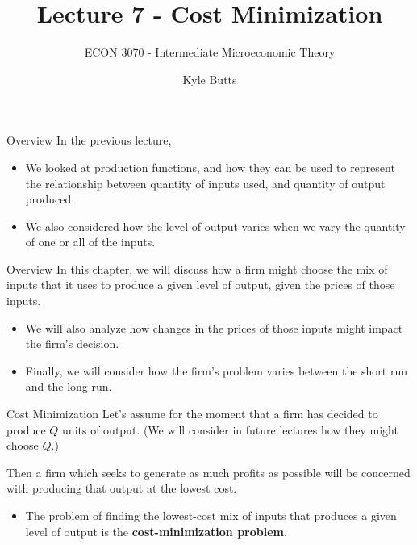 \documentclass[11pt,t]{beamer}
\author{Kyle Butts}
\title{Lecture 7  - Cost Minimization}
\subtitle{ECON 3070 - Intermediate Microeconomic Theory}
\begin{document}
\begin{frame}
  \titlepage
\end{frame}

\begin{frame}{Overview}
  In the previous lecture,

  \begin{itemize}
    \item We looked at production functions, and how they can be used to represent the relationship between quantity of inputs used, and quantity of output produced.

    \item We also considered how the level of output varies when we vary the quantity of one or all of the inputs.
  \end{itemize}
\end{frame}

\begin{frame}{Overview}
  In this chapter, we will discuss how a firm might choose the mix of inputs that it uses to produce a given level of output, given the prices of those inputs.

  \begin{itemize}
    \item We will also analyze how changes in the prices of those inputs might impact the firm's decision.

    \item Finally, we will consider how the firm's problem varies between the short run and the long run.
  \end{itemize}
\end{frame}


\begin{frame}{Cost Minimization}
  Let's assume for the moment that a firm has decided to produce $Q$ units of output. (We will consider in future lectures how they might choose $Q$.)

  \bigskip
  Then a firm which seeks to generate as much profits as possible will be concerned with producing that output at the lowest cost.

  \pause\bigskip
  \begin{itemize}
    \item The problem of finding the lowest-cost mix of inputs that produces a given level of output is the \textbf{cost-minimization problem}.
  \end{itemize}
\end{frame}
\end{document}

